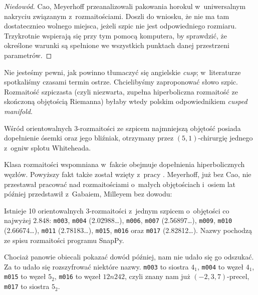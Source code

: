 \begin{proof}[Niedowód]
%
%
    Cao, Meyerhoff \cite{cao01} przeanalizowali pakowania horokul w~uniwersalnym nakryciu związanym z~rozmaitościami.
    Doszli do wniosku, że nie ma tam dostatecznieo wolnego miejsca, jeżeli szpic nie jest odpowiedniego rozmiaru.
%
    Trzykrotnie wspierają się przy tym pomocą komputera, by sprawdzić, że określone warunki są spełnione we wszystkich punktach danej przestrzeni parametrów.
\end{proof}

Nie jesteśmy pewni, jak powinno tłumaczyć się  angielskie \emph{cusp}; w~literaturze spotkaliśmy czasami termin ostrze.
%
Chcielibyśmy zaproponować słowo szpic.
Rozmaitość szpiczasta (czyli niezwarta, zupełna hiperboliczna rozmaitość ze skończoną objętością Riemanna) byłaby wtedy polskim odpowiednikiem \emph{cusped manifold}.

\begin{proposition}
%
    Wśród orientowalnych 3-rozmaitości ze szpicem najmniejszą objętość posiada dopełnienie ósemki oraz jego bliźniak, otrzymany przez $(5, 1)$-chirurgię jednego z~ogniw splotu Whiteheada.
%
\end{proposition}

Klasa rozmaitości wspomniana w~fakcie obejmuje dopełnienia hiperbolicznych węzłów.
Powyższy fakt także został wzięty z~pracy \cite{cao01}.
Meyerhoff, już bez Cao, nie przestawał pracować nad rozmaitościami o~małych objętościach i~osiem lat później przedstawił z~Gabaiem, Milleyem \cite{meyerhoff09} bez dowodu:
%
%

\begin{proposition}
%
    Istnieje 10 orientowalnych 3-rozmaitości z~jednym szpicem o~objętości co najwyżej $2.848$: \texttt{m003}, \texttt{m004} (2.02988\ldots), \texttt{m006}, \texttt{m007} (2.56897\ldots), \texttt{m009}, \texttt{m010} (2.66674\ldots), \texttt{m011} (2.78183\ldots), \texttt{m015}, \texttt{m016} oraz \texttt{m017} (2.82812\ldots).
    Nazwy pochodzą ze spisu rozmaitości programu SnapPy.
\end{proposition}

Chociaż panowie obiecali pokazać dowód później, nam nie udało się go odszukać.
Za to udało się rozszyfrować niektóre nazwy.
\texttt{m003} to siostra $4_1$, %
\texttt{m004} to węzeł $4_1$, %
\texttt{m015} to węzeł $5_2$,
\texttt{m016} to węzeł $12n242$, czyli znany nam już $(-2, 3, 7)$-precel,
%
\texttt{m017} to siostra $5_2$. %

